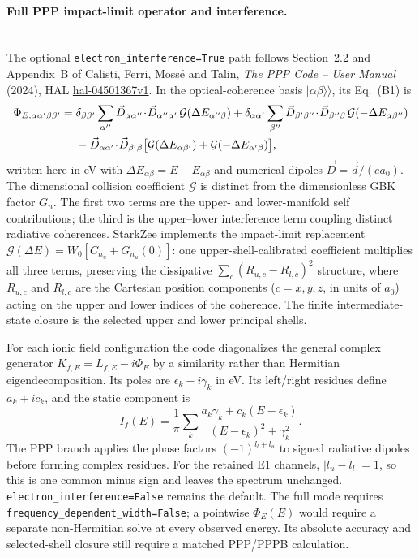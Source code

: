 \documentclass[11pt,a4paper]{article}
\numberwithin{equation}{section}
\begin{document}
\paragraph{Full PPP impact-limit operator and interference.}
\mbox{}\\
The optional \texttt{electron\_\allowbreak interference=True} path follows Section~2.2 and Appendix~B of Calisti, Ferri, Moss\'e and Talin, \emph{The PPP Code -- User Manual} (2024), HAL \href{https://hal.science/hal-04501367v1}{hal-04501367v1}. In the optical-coherence basis $|\alpha\beta\rangle\!\rangle$, its Eq.~(B1) is
\begin{align}
\Phi_{E,\alpha\alpha'\beta\beta'}={}&
\delta_{\beta\beta'}\sum_{\alpha''}
\vec D_{\alpha\alpha''}\!\cdot\!\vec D_{\alpha''\alpha'}\,\mathcal G(\Delta E_{\alpha''\beta})
+\delta_{\alpha\alpha'}\sum_{\beta''}
\vec D_{\beta'\beta''}\!\cdot\!\vec D_{\beta''\beta}\,\mathcal G(-\Delta E_{\alpha\beta''}) \notag\\
&-\vec D_{\alpha\alpha'}\!\cdot\!\vec D_{\beta'\beta}\bigl[\mathcal G(\Delta E_{\alpha\beta'})+\mathcal G(-\Delta E_{\alpha'\beta})\bigr],
\end{align}
written here in eV with $\Delta E_{\alpha\beta}=E-E_{\alpha\beta}$ and numerical dipoles $\vec D=\vec d/(ea_0)$. The dimensional collision coefficient $\mathcal G$ is distinct from the dimensionless GBK factor $G_n$. The first two terms are the upper- and lower-manifold self contributions; the third is the upper--lower interference term coupling distinct radiative coherences. StarkZee implements the impact-limit replacement $\mathcal G(\Delta E)=W_0[C_{n_u}+G_{n_u}(0)]$: one upper-shell-calibrated coefficient multiplies all three terms, preserving the dissipative $\sum_c(R_{u,c}-R_{l,c})^2$ structure, where $R_{u,c}$ and $R_{l,c}$ are the Cartesian position components ($c=x,y,z$, in units of $a_0$) acting on the upper and lower indices of the coherence. The finite intermediate-state closure is the selected upper and lower principal shells.

For each ionic field configuration the code diagonalizes the general complex generator $K_{f,E}=L_{f,E}-i\Phi_E$ by a similarity rather than Hermitian eigendecomposition. Its poles are $\epsilon_k-i\gamma_k$ in eV. Its left/right residues define $a_k+i c_k$, and the static component is
\begin{equation}
I_f(E)=\frac{1}{\pi}\sum_k
\frac{a_k\gamma_k+c_k(E-\epsilon_k)}{(E-\epsilon_k)^2+\gamma_k^2}.
\end{equation}
The PPP branch applies the phase factors $(-1)^{l_l+l_u}$ to signed radiative dipoles before forming complex residues. For the retained E1 channels, $|l_u-l_l|=1$, so this is one common minus sign and leaves the spectrum unchanged. \texttt{electron\_interference=False} remains the default. The full mode requires \texttt{frequency\_dependent\_width=False}; a pointwise $\Phi_E(E)$ would require a separate non-Hermitian solve at every observed energy. Its absolute accuracy and selected-shell closure still require a matched PPP/PPPB calculation.
\end{document}
